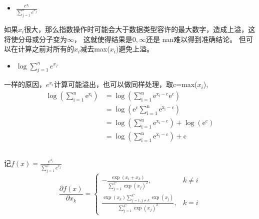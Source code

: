 \documentclass[UTF8,a4paper,AutoFakeBold,AutoFakeSlant]{article}
\begin{document}
\begin{itemize}
  \item $ \frac{e^{x_i}}{\sum_{j=1}^n e^{x_j}} $
\end{itemize}
如果$x_i$很大，那么指数操作时可能会大于数据类型容许的最大数字，造成上溢，这将使分母或分子变为$\infty$，
这就使得结果是$0, \infty$还是 nan难以得到准确结论。
但可以在计算之前对所有的$x_i$减去max($x_i$)避免上溢。
\begin{itemize}
  \item $ \log{\sum_{j=1}^n e^{x_j}} $
\end{itemize}
一样的原因，$e^{x_i}$计算可能溢出，也可以做同样处理，取c=max($x_i$),
\begin{equation*}
  \begin{aligned}
    \log \left(\sum_{\mathrm{i}=1}^{\mathrm{n}} \mathrm{e}^{\mathrm{x}_{\mathrm{i}}}\right)
     & =\log \left(\sum_{\mathrm{i}=1}^{\mathrm{n}} \mathrm{e}^{\mathrm{x}_{\mathrm{i}}-\mathrm{c}} \mathrm{e}^{\mathrm{c}}\right)                   \\
     & =\log \left(\mathrm{e}^{\mathrm{c}} \sum_{\mathrm{i}=1}^{\mathrm{n}} \mathrm{e}^{\mathrm{x}_{\mathrm{i}}-\mathrm{c}}\right)                   \\
     & =\log \left(\sum_{\mathrm{i}=1}^{\mathrm{n}} \mathrm{e}^{\mathrm{x}_{\mathrm{i}}-\mathrm{c}}\right)+\log \left(\mathrm{e}^{\mathrm{c}}\right) \\
     & =\log \left(\sum_{\mathrm{i}=1}^{\mathrm{n}} \mathrm{e}^{\mathrm{x}_{\mathrm{i}}-\mathrm{c}}\right)+\mathrm{c}
  \end{aligned}
\end{equation*}



\subsection{}

记$ f(x) = \frac{e^{x_i}}{\sum_{j=1}^C e^{x_j}} $
\begin{equation*}
  \frac{\partial f(x)}{\partial x_{k}}=\left\{\begin{array}{ll}
    -\frac{\exp \left(x_{i}+x_{k}\right)}{\sum_{j=1}^{C} \exp \left(x_{j}\right)^{2}},                                           & k \neq i \\
    \frac{\exp \left(x_{k}\right) \sum_{j=1, j \neq k}^{C} \exp \left(x_{j}\right)}{\sum_{j=1}^{C} \exp \left(x_{j}\right)^{2}}, & k=i
  \end{array}\right.
\end{equation*}
\end{document}
